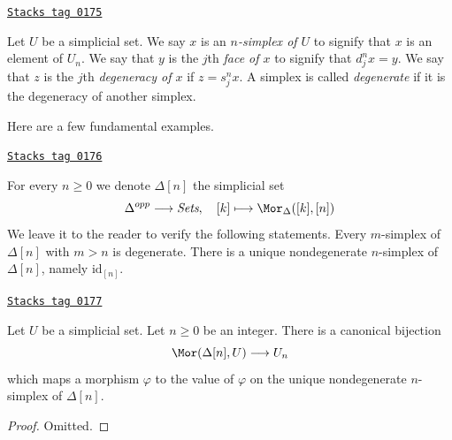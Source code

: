 \begin{definition}
\label{simplicial-definition-terminology-simplicial-sets}
\href{https://stacks.math.columbia.edu/tag/0175}{\texttt{Stacks tag 0175}}

Let $U$ be a simplicial set.
We say $x$ is an {\it $n$-simplex of $U$} to signify that
$x$ is an element of $U_n$. We say that $y$ is the $j$th
{\it face of $x$} to signify that $d^n_jx = y$. We say that
$z$ is the $j$th {\it degeneracy of $x$} if $z = s^n_jx$.
A simplex is called {\it degenerate} if it is the degeneracy
of another simplex.
\end{definition}

Here are a few fundamental examples.

\begin{example}
\label{simplicial-example-simplex-simplicial-set}
\href{https://stacks.math.columbia.edu/tag/0176}{\texttt{Stacks tag 0176}}

For every $n \geq 0$ we denote $\Delta[n]$ the simplicial set
$$
\Delta^{opp} \longrightarrow \textit{Sets},\quad
[k] \longmapsto \Mor_{\Delta}([k], [n])
$$
We leave it to the reader to verify the following statements.
Every $m$-simplex of $\Delta[n]$ with $m > n$ is degenerate.
There is a unique nondegenerate $n$-simplex of $\Delta[n]$,
namely $\text{id}_{[n]}$.
\end{example}

\begin{lemma}
\label{simplicial-lemma-simplex-map}
\href{https://stacks.math.columbia.edu/tag/0177}{\texttt{Stacks tag 0177}}

Let $U$ be a simplicial set. Let $n \geq 0$ be an integer.
There is a canonical bijection
$$
\Mor(\Delta[n], U)
\longrightarrow
U_n
$$
which maps a morphism $\varphi$ to the value of $\varphi$
on the unique nondegenerate $n$-simplex of $\Delta[n]$.
\end{lemma}

\begin{proof}
Omitted.
\end{proof}

